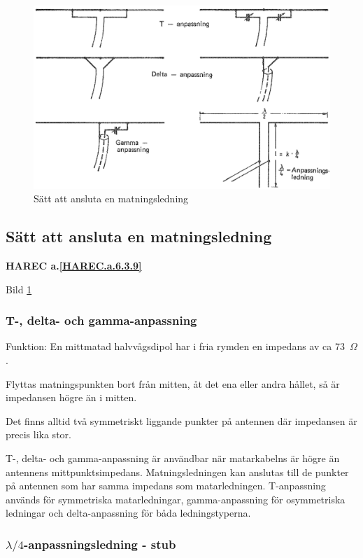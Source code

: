 \begin{figure}
  \includegraphics[width=\textwidth]{images/cropped_pdfs/bild_2_6-31.pdf}
  \caption{Sätt att ansluta en matningsledning}
  \label{fig:bildII6-31}
\end{figure}

\subsection{Sätt att ansluta en matningsledning}
\textbf{
HAREC a.\ref{HAREC.a.6.3.9}\label{myHAREC.a.6.3.9}
}

Bild \ref{fig:bildII6-31}

\subsubsection{T-, delta- och gamma-anpassning}

Funktion: En mittmatad halvvågsdipol har i fria rymden en impedans av ca 73~\(\Omega\).

Flyttas matningspunkten bort från mitten, åt det ena eller andra
hållet, så är impedansen högre än i mitten.

Det finns alltid två symmetriskt liggande punkter på antennen där
impedansen är precis lika stor.

T-, delta- och gamma-anpassning är användbar när matarkabelns är högre
än antennens mittpunktsimpedans. Matningsledningen kan anslutas till
de punkter på antennen som har samma impedans som
matarledningen. T-anpassning används för symmetriska matarledningar,
gamma-anpassning för osymmetriska ledningar och delta-anpassning för
båda ledningstyperna.

\subsubsection{\(\lambda/4\)-anpassningsledning - stub}

